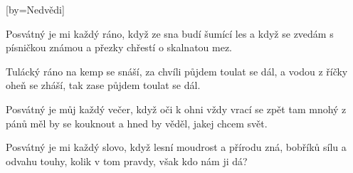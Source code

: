 [by={Nedvědi}]

\beginverse{}
Posvátný je mi každý ráno, když ze sna budí šumící les
a když se zvedám s písničkou známou
a přezky chřestí o skalnatou mez.
\endverse{}

\beginchorus{}
Tulácký ráno na kemp se snáší, za chvíli půjdem toulat se dál,
a vodou z říčky oheň se zháší, tak zase půjdem toulat se dál.
\endchorus{}

\beginverse{}
Posvátný je můj každý večer, když oči k ohni vždy vrací se zpět
tam mnohý z pánů měl by se kouknout
a hned by věděl, jakej chcem svět.
\endverse{}

\beginchorus{}

\endchorus{}

\beginverse{}
Posvátný je mi každý slovo, když lesní moudrost a přírodu zná,
bobříků sílu a odvahu touhy,
kolik v tom pravdy, však kdo nám ji dá?
\endverse{}

\beginchorus{}


\endchorus{}

\endsong{}
